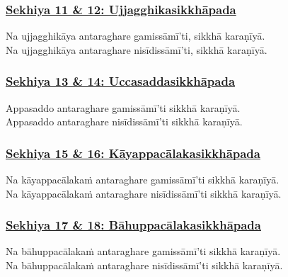 \subsubsection*{\hyperref[training11-12]{Sekhiya 11 \& 12: Ujjagghikasikkhāpada}}
\label{sekh11-12}

Na ujjagghikāya\makeatletter\hyperlink{endnote475-appendix}\makeatother{} antaraghare gamissāmī'ti, sikkhā karaṇīyā.\\
Na ujjagghikāya antaraghare nisīdissāmī'ti, sikkhā karaṇīyā.



\subsubsection*{\hyperref[training13-14]{Sekhiya 13 \& 14: Uccasaddasikkhāpada}}
\label{sekh13-14}

Appasaddo antaraghare gamissāmī'ti sikkhā karaṇīyā.\\
Appasaddo antaraghare nisīdissāmī'ti sikkhā karaṇīyā.



\subsubsection*{\hyperref[training15-16]{Sekhiya 15 \& 16: Kāyappacālakasikkhāpada}}
\label{sekh15-16}

Na kāyappacālakaṁ antaraghare gamissāmī'ti sikkhā karaṇīyā.\\
Na kāyappacālakaṁ antaraghare nisīdissāmī'ti sikkhā karaṇīyā.



\subsubsection*{\hyperref[training17-18]{Sekhiya 17 \& 18: Bāhuppacālakasikkhāpada}}
\label{sekh17-18}

Na bāhuppacālakaṁ antaraghare gamissāmī'ti sikkhā karaṇīyā.\\
Na bāhuppacālakaṁ antaraghare nisīdissāmī'ti sikkhā karaṇīyā.



